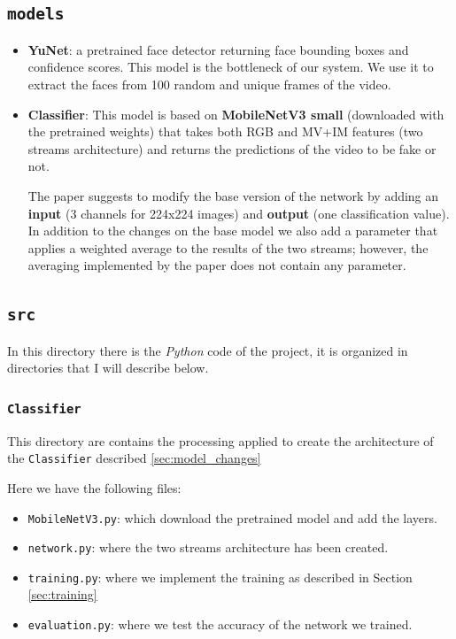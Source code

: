\documentclass[a4paper,12pt]{article}
\begin{document}
\subsection{\texttt{models}}
\label{sec:models}

\begin{itemize}
  \item \textbf{YuNet}: a pretrained face detector returning face bounding boxes and confidence scores. This model is the bottleneck of our system. We use it to extract the faces from 100 random and unique frames of the video. 
  
  \item \textbf{Classifier}: \label{sec:model_changes}This model is based on \textbf{MobileNetV3 small} (downloaded with the pretrained weights) that takes both RGB and MV+IM features (two streams architecture) and returns the predictions of the video to be fake or not.  
  
  
  The paper suggests to modify the base version of the network by adding an \textbf{input} (3 channels for 224x224 images) and \textbf{output} (one classification value). In addition to the changes on the base model we also add a parameter that applies a weighted average to the results of the two streams; however, the averaging implemented by the paper does not contain any parameter.  
\end{itemize}

\subsection{\texttt{src}}

In this directory there is the \textit{Python} code of the project, it is organized in directories that I will describe below.

\subsubsection{\texttt{Classifier}}
This directory are contains the processing applied to create the architecture of the \texttt{Classifier} described \ref{sec:model_changes} 

Here we have the following files:
\begin{itemize}
    \item \texttt{MobileNetV3.py}: which download the pretrained model and add the layers. 
    \item \texttt{network.py}: where the two streams architecture has been created.
    \item \texttt{training.py}: where we implement the training as described in Section \ref{sec:training}
    \item \texttt{evaluation.py}: where we test the accuracy of the network we trained.
\end{itemize}
\end{document}
